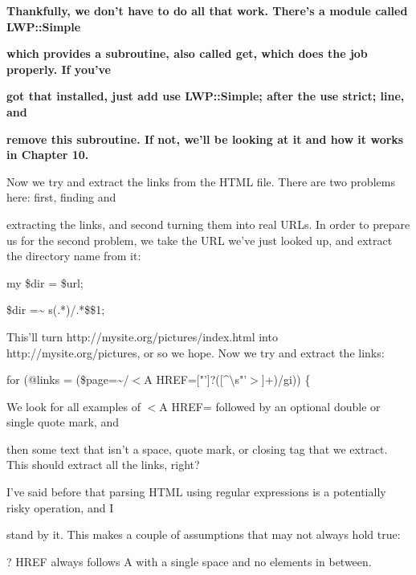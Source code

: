 \documentclass[a4paper,11pt]{book}
\begin{document}
\noindent 

\noindent 

\noindent \textbf{Thankfully, we don't have to do all that work. There's a module called LWP::Simple}

\noindent \textbf{which provides a subroutine, also called get, which does the job properly. If you've}

\noindent \textbf{got that installed, just add use LWP::Simple; after the use strict; line, and}

\noindent \textbf{remove this subroutine. If not, we'll be looking at it and how it works in Chapter 10.}

\noindent 

\noindent 

\noindent Now we try and extract the links from the HTML file. There are two problems here: first, finding and

\noindent extracting the links, and second turning them into real URLs. In order to prepare us for the second problem, we take the URL we've just looked up, and extract the directory name from it:

\noindent 

\noindent my \$dir = \$url;

\noindent \$dir =\~{} s\textbar (.*)/.*\$\textbar \$1\textbar ;

\noindent 

\noindent This'll turn http://mysite.org/pictures/index.html into http://mysite.org/pictures, or so we hope. Now we try and extract the links:

\noindent for (@links = (\$page=\~{}/$<$A HREF=["']?([\^{}\textbackslash s"'$>$]+)/gi)) \{

\noindent 

\noindent We look for all examples of  $<$A HREF= followed  by  an  optional  double  or  single  quote  mark,  and

\noindent then some text that  isn't a  space,  quote  mark,  or closing  tag  that  we  extract.  This  should  extract  all  the links, right?

\noindent 

\noindent I've said before that parsing HTML using regular expressions is a potentially risky operation, and I

\noindent stand by it. This makes a couple of assumptions that may not always hold true:

\noindent 

\noindent ? HREF always follows A with a single space and no elements in between.
\end{document}
